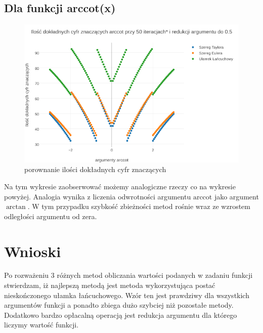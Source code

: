\documentclass{article}
\begin{document}
\subsection{Dla funkcji arccot(x)}
	\FloatBarrier
	\begin{figure}[h]
		\includegraphics[width=1.1\textwidth,scale=0.5]{acot_znaczace.png}
		\caption{porownanie ilości dokładnych cyfr znaczących}
		\label{wskaźnik uwarunkowania}
	\end{figure}

Na tym wykresie zaobserwować możemy analogiczne rzeczy co na wykresie powyżej. Analogia wynika z liczenia odwrotności argumentu $\textrm{arccot}$ jako argument $\arctan$. W tym przypadku szybkość zbieżności metod rośnie wraz ze wzrostem odległości argumentu od zera.
	
\section{Wnioski}
Po rozważeniu 3 różnych metod obliczania wartości podanych w zadaniu funkcji stwierdzam, iż najlepszą metodą jest metoda wykorzystująca postać nieskończonego ułamka łańcuchowego. Wzór ten jest prawdziwy dla wszystkich argumentów funkcji a ponadto zbiega dużo szybciej niż pozostałe metody.\\
\indent Dodatkowo bardzo opłacalną operacją jest redukcja argumentu dla którego liczymy wartość funkcji.
\end{document}
